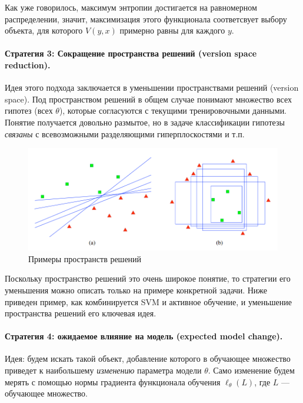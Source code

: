 \documentclass[specialist, 12pt, href]{article}
\begin{document}
Как уже говорилось, максимум энтропии достигается на равномерном
распределении, значит, максимизация этого функционала соответсвует
выбору объекта, для которого \(V(y, x)\) примерно равны для каждого
\(y\).

\paragraph{Стратегия 3: Сокращение пространства решений (version space
reduction).}

Идея этого подхода заключается в уменьшении пространствами решений
(version space). Под пространством решений в общем случае понимают
множество всех гипотез (всех $\theta$), которые согласуются с текущими тренировочными
данными. Понятие получается довольно размытое, но в задаче классификации
гипотезы \emph{связаны} с всевозможными разделяющими гиперплоскостями и
т.п.

\begin{figure}[htbp]
\centering
\includegraphics[width=6in]{img/vs.png}
\caption{Примеры пространств решений}
\end{figure}

Поскольку пространство решений это очень широкое понятие, то стратегии
его уменьшения можно описать только на примере конкретной задачи. Ниже
приведен пример, как комбинируется SVM и активное обучение, и уменьшение
пространства решений его ключевая идея.

\paragraph{Стратегия 4: ожидаемое влияние на модель (expected model
change).}

Идея: будем искать такой объект, добавление которого в обучающее
множество приведет к наибольшему \emph{изменению} параметра модели
\(\theta\). Само изменение будем мерять с помощью нормы градиента
функционала обучения \(\ell_{\theta}(L)\), где \(L\) --- обучающее
множество.
\end{document}
